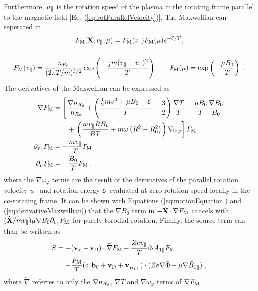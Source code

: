 Furthermore, $u_\parallel$ is the rotation speed of the plasma in the rotating frame parallel to the magnetic field [Eq. (\ref{eq:rotParallelVelocity})]. The Maxwellian can seperated in 
\begin{gather}
	F_\mathrm{M}(\boldsymbol{\mathbf{X}}, v_\parallel, \mu) = F_\mathrm{M}(v_\parallel) F_\mathrm{M}(\mu) e^{-\mathcal{E}/T} , \\[0,5cm]
	F_\mathrm{M}(v_\parallel) = \frac{n_{R_0}}{(2\pi T/m)^{3/2}} \exp\left(-\frac{\frac{1}{2} m (v_\parallel - u_\parallel)^2}{T}\right) \qquad F_\mathrm{M}(\mu) = \exp\left(-\frac{\mu B_0}{T}\right) ~.
	\label{eq:maxwellianSeperated}
\end{gather}
The derivatives of the Maxwellian can be expressed as 
\begin{gather}
	\begin{aligned}
		\nabla F_\mathrm{M}           &= \left[\frac{\nabla n_{R_0}}{n_{R_0}} + \left(\frac{\frac{1}{2} m v_\parallel^2 + \mu B_0 + \mathcal{E}}{T} - \frac{3}{2}\right)\frac{\nabla T}{T} - \frac{\mu B_0}{T} \frac{\nabla B_0}{B_0} \right. \\ 
		&\qquad + \left. \left(\frac{m v_\parallel R B_\mathrm{t}}{BT} + m\omega \left(R^2 - R_0^2\right)\right) \nabla \omega_\varphi\right] F_\mathrm{M} \\
		\partial_{v_\parallel} F_\mathrm{M} &= - \frac{m v_\parallel}{T} F_\mathrm{M} \\
		\partial_\mu F_\mathrm{M}     &= - \frac{B_0}{T} F_\mathrm{M} ~,  
	\end{aligned}
	\label{eq:derivativeMaxwellian}
\end{gather} 
where the $\nabla \omega_\varphi$ terms are the result of the derivatives of the parallel rotation velocity $u_\parallel$ and rotation energy $\mathcal{E}$ evaluated at zero rotation speed locally in the co-rotating frame. \cite{Peeters2009B} It can be shown with Equations (\ref{eq:motionEquation}) and (\ref{eq:derivativeMaxwellian}) that the $\nabla B_0$ term in $-\dot{\boldsymbol{\mathbf{X}}}\cdot \nabla F_\mathrm{M}$ cancels with $(\dot{\boldsymbol{\mathbf{X}}}/m v_\parallel) \mu \nabla B_0 \partial_{v_\parallel} F_\mathrm{M}$ for purely torodial rotation. Finally, the source term can than be written as 
\begin{gather}
	\begin{aligned}
		S = -& (\boldsymbol{\mathbf{v}}_\chi + \boldsymbol{\mathbf{v}}_\mathrm{D}) \cdot \widetilde{\nabla} F_\mathrm{M} - \frac{Z e v_\parallel}{T} \partial_t \bar{A}_{1\parallel} F_\mathrm{M} \\
		    -& \frac{F_\mathrm{M}}{T} (v_\parallel \boldsymbol{\mathbf{b}}_0 + \boldsymbol{\mathbf{v}}_\mathrm{D} + \boldsymbol{\mathbf{v}}_{\bar{B}_{1\perp}}) \cdot (Z e \nabla \bar{\Phi} + \mu \nabla \bar{B}_{1\parallel})~,
	\end{aligned}
	\label{eq:sourceTerm}
\end{gather}
where $\widetilde{\nabla}$ referres to only the $\nabla n_{R_0}$, $\nabla T$ and $\nabla \omega_\varphi$ terms of $\nabla F_\mathrm{M}$. \bigskip

